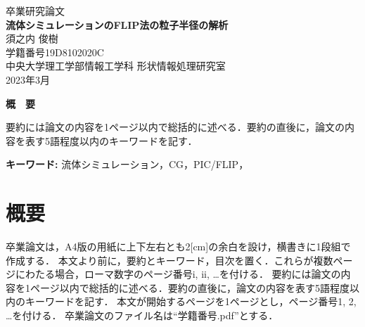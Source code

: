 \documentclass[a4j,12pt]{jreport}
\begin{document}
\thispagestyle{empty}
\begin{center}
\begin{Large}
\vspace*{0.7cm}
{\large 卒業研究論文}\\
\vspace*{2.5cm}
{\bf 流体シミュレーションのFLIP法の粒子半径の解析}\\
\vspace*{7.5cm}
須之内 俊樹\\
学籍番号\hspace*{1zw}19D8102020C\\
\vspace*{2.5cm}
中央大学理工学部情報工学科\hspace*{1zw} 形状情報処理研究室\\
\vspace*{3.0cm}
2023年3月\\
\end{Large}
\end{center}


\newpage
\renewcommand{\baselinestretch}{1.25} \selectfont
{}


\begin{center} {\large \bf{概　要}} \end{center}

要約には論文の内容を1ページ以内で総括的に述べる．要約の直後に，論文の内容を表す5語程度以内のキーワードを記す．


\vspace{1zw} \noindent
{\bf キーワード: }流体シミュレーション，CG，PIC/FLIP，

\tableofcontents


\newpage
{}

\chapter{概要} \label{chapter:1}

卒業論文は，A4版の用紙に上下左右とも2[cm]の余白を設け，横書きに1段組で作成する．
本文より前に，要約とキーワード，目次を置く．これらが複数ページにわたる場合，ローマ数字のページ番号i, ii, …を付ける．
要約には論文の内容を1ページ以内で総括的に述べる．要約の直後に，論文の内容を表す5語程度以内のキーワードを記す．
本文が開始するページを1ページとし，ページ番号1, 2, …を付ける．
卒業論文のファイル名は“学籍番号.pdf”とする．
\end{document}
